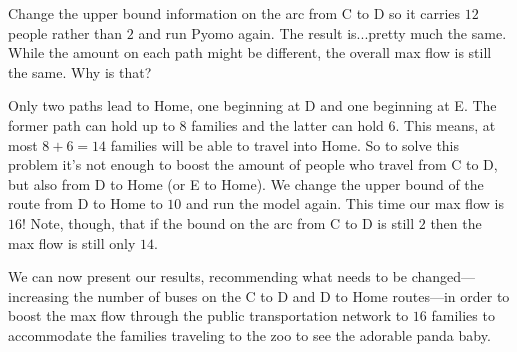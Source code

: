\documentclass{article}
\begin{document}
Change the upper bound information on the arc from C to D so it carries $12$ people rather than $2$ and run Pyomo again.  The result is...pretty much the same.  While the amount on each path might be different, the overall max flow is still the same.  Why is that?

Only two paths lead to Home, one beginning at D and one beginning at E.  The former path can hold up to $8$ families and the latter can hold $6$.  This means, at most $8+6=14$ families will be able to travel into Home.  So to solve this problem it's not enough to boost the amount of people who travel from C to D, but also from D to Home (or E to Home).  We change the upper bound of the route from D to Home to $10$ and run the model again.  This time our max flow is $16$!  Note, though, that if the bound on the arc from C to D is still $2$ then the max flow is still only $14$.  

We can now present our results, recommending what needs to be changed---increasing the number of buses on the C to D and D to Home routes---in order to boost the max flow through the public transportation network to $16$ families to accommodate the families traveling to the zoo to see the adorable panda baby.
\end{document}
